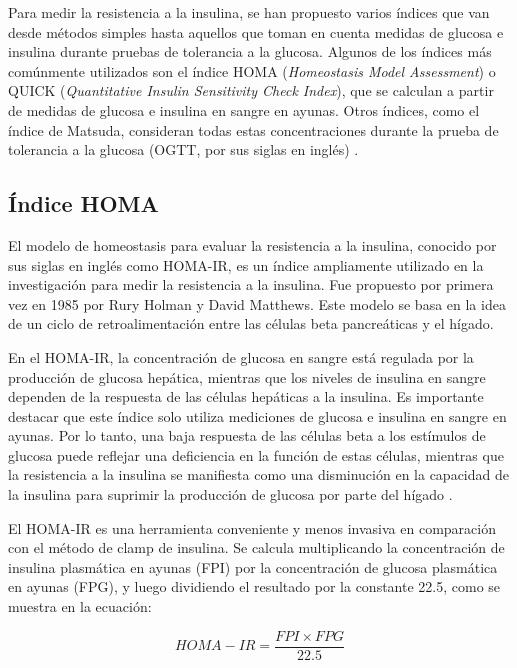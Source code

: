 Para medir la resistencia a la insulina, se han propuesto varios índices que van desde métodos simples hasta aquellos que toman en cuenta medidas de glucosa e insulina durante pruebas de tolerancia a la glucosa. Algunos de los índices más comúnmente utilizados son el índice HOMA (\textit{Homeostasis Model Assessment}) o QUICK (\textit{Quantitative Insulin Sensitivity Check Index}), que se calculan a partir de medidas de glucosa e insulina en sangre en ayunas. Otros índices, como el índice de Matsuda, consideran todas estas concentraciones durante la prueba de tolerancia a la glucosa (OGTT, por sus siglas en inglés) \cite{MedicionEstimacion}.




\subsection{Índice HOMA}

El modelo de homeostasis para evaluar la resistencia a la insulina, conocido por sus siglas en inglés como HOMA-IR, es un índice ampliamente utilizado en la investigación para medir la resistencia a la insulina. Fue propuesto por primera vez en 1985 por Rury Holman y David Matthews. Este modelo se basa en la idea de un ciclo de retroalimentación entre las células beta pancreáticas y el hígado.

En el HOMA-IR, la concentración de glucosa en sangre está regulada por la producción de glucosa hepática, mientras que los niveles de insulina en sangre dependen de la respuesta de las células hepáticas a la insulina. Es importante destacar que este índice solo utiliza mediciones de glucosa e insulina en sangre en ayunas. Por lo tanto, una baja respuesta de las células beta a los estímulos de glucosa puede reflejar una deficiencia en la función de estas células, mientras que la resistencia a la insulina se manifiesta como una disminución en la capacidad de la insulina para suprimir la producción de glucosa por parte del hígado \cite{indicesRes}.

El HOMA-IR es una herramienta conveniente y menos invasiva en comparación con el método de clamp de insulina. Se calcula multiplicando la concentración de insulina plasmática en ayunas (FPI) por la concentración de glucosa plasmática en ayunas (FPG), y luego dividiendo el resultado por la constante 22.5, como se muestra en la ecuación:

\begin{equation}\label{HOMAIR}
    HOMA-IR = \frac{FPI \times FPG}{22.5}
\end{equation}

